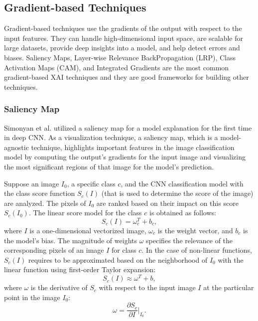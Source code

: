 \documentclass[final,5p,times,twocolumn]{elsarticle}
\begin{document}
\subsection{Gradient-based Techniques}
Gradient-based techniques use the gradients of the output with respect to the input features.  
They can handle high-dimensional input space, are scalable for large datasets, provide deep insights into a model, and help detect errors and biases. Saliency Maps, Layer-wise Relevance BackPropagation (LRP), Class Activation Maps (CAM), and Integrated Gradients are the most common gradient-based XAI techniques and they are good frameworks for building other techniques. 


\subsubsection{Saliency Map}
 
Simonyan et al. \cite{simonyan2013deep} utilized a saliency map for a model explanation for the first time in deep CNN. As a visualization technique, a saliency map, which is a model-agnostic technique, highlights important features in the image classification model by computing the output's gradients for the input image and visualizing the most significant regions of that image for the model's prediction.

Suppose an image $I_{0}$, a specific class $c$, and the CNN classification model with the class score function $S_c(I)$ (that is used to determine the score of the image) are analyzed. The pixels of $I_{0}$ are ranked based on their impact on this score $S_c(I_0)$. The linear score model for the class $c$ is obtained as follows:
\begin{equation}
S_c(I)=\omega_c^T + b_c, 
\end{equation}
where $I$ is a one-dimensional vectorized image, $\omega_c$ is the weight vector, and $b_c$ is the model's bias. The magnitude of weights $\omega$ specifies the relevance of the corresponding pixels of an image $I$ for class $c$. 
In the case of non-linear functions, $S_c(I)$ requires to be approximated based on the neighborhood of $I_0$ with the linear function using first-order Taylor expansion:
\begin{equation}
S_c(I) \approx \omega^T + b,    
\end{equation}
where $\omega$ is the derivative of $S_c$ with respect to the input image $I$ at the particular point in the image $I_0$:
\begin{equation}
\omega = \frac{\partial S_c}{\partial I}\bigg|_{I_{0}}.    
\end{equation}
\end{document}
